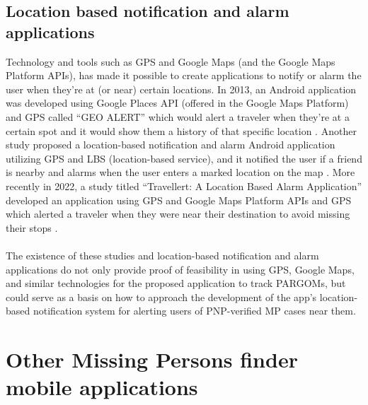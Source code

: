 \subsection{Location based notification and alarm applications}

Technology and tools such as GPS and Google Maps (and the Google Maps Platform APIs), has made it possible to create applications to notify or alarm the user when they’re at (or near) certain locations. In 2013, an Android application was developed using Google Places API (offered in the Google Maps Platform) and GPS called “GEO ALERT” which would alert a traveler when they’re at a certain spot and it would show them a history of that specific location \cite{garg2013geo}. Another study proposed a location-based notification and alarm Android application utilizing GPS and LBS (location-based service), and it notified the user if a friend is nearby and alarms when the user enters a marked location on the map \cite{kanfade2018location}. More recently in 2022, a study titled “Travellert: A Location Based Alarm Application” developed an application using GPS and Google Maps Platform APIs and GPS which alerted a traveler when they were near their destination to avoid missing their stops \cite{travellert}.
\\\\The existence of these studies and location-based notification and alarm applications do not only provide proof of feasibility in using GPS, Google Maps, and similar technologies for the proposed application to track PARGOMs, but could serve as a basis on how to approach the development of the app’s location-based notification system for alerting users of PNP-verified MP cases near them.


\section{Other Missing Persons finder mobile applications}


